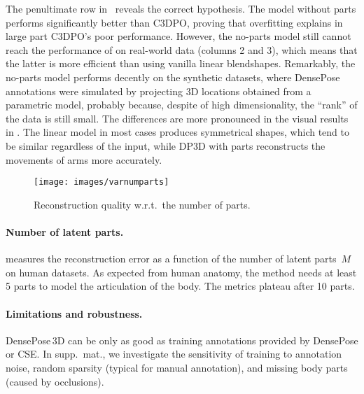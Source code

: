 The penultimate row in~ reveals the correct hypothesis.
The model without parts performs significantly better than C3DPO, proving that overfitting explains in large part C3DPO's poor performance.
However, the no-parts model still cannot reach the performance of \method on real-world data (columns 2 and 3), which means that the latter is more efficient than using vanilla linear blendshapes.
Remarkably, the no-parts model performs decently on the synthetic datasets, where  DensePose  annotations  were  simulated  by projecting 3D locations obtained from a parametric model, probably because, despite of high dimensionality, the ``rank'' of the data is still small.
The differences are more pronounced in the visual results in .
The linear model in most cases produces symmetrical shapes, which tend to be similar regardless of the input, while DP3D with parts reconstructs the movements of arms more accurately.\vspace{-0.5ex}

\begin{figure}[b!]%
    \texttt{[image: images/varnumparts]}%
    \caption{%
    Reconstruction quality w.r.t.~the number of parts.%
    }
    \label{f:varnumparts}
\end{figure}

\paragraph{Number of latent parts.}

 measures the reconstruction error as a function of the number of latent parts~$M$ on human datasets.
As expected from human anatomy, the method needs at least 5 parts to model the articulation of the body.
The metrics plateau after 10 parts.\vspace{-0.5ex}%

\paragraph{Limitations and robustness.}
DensePose\,3D can be only as good as training annotations provided by DensePose or CSE.
In supp.~mat., we investigate the sensitivity of training to annotation noise, random sparsity (typical for manual annotation), and missing body parts (caused by occlusions).
